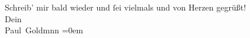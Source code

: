 \pstart
           Schreib’ mir bald wieder und{ }ſei vielmals und von Herzen gegrüßt! {\\[\baselineskip]}Dein {\\[\baselineskip]}\spacefill\mbox{Paul Goldmnn}\pend
           \leftskip=0em{}\endnumbering{}  \newcommand{\dateiname}{L03211}\newcommand{\titel}{Paul Goldmann an Arthur Schnitzler, 16. 6. [1902]}\newcommand{\editorInnen}{Martin Anton Müller und Laura Untner}
